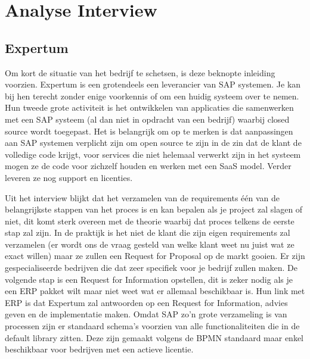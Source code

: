 
\chapter{Analyse Interview}
\label{ch:analyse_interview}

\section{Expertum}

Om kort de situatie van het bedrijf te schetsen, is deze beknopte inleiding voorzien. Expertum is een grotendeels een leverancier van SAP systemen. Je kan bij hen terecht zonder enige voorkennis of om een huidig systeem over te nemen. Hun tweede grote activiteit is het ontwikkelen van applicaties die samenwerken met een SAP systeem (al dan niet in opdracht van een bedrijf) waarbij closed source wordt toegepast. Het is belangrijk om op te merken is dat aanpassingen aan SAP systemen verplicht zijn om open source te zijn in de zin dat de klant de volledige code krijgt, voor services die niet helemaal verwerkt zijn in het systeem mogen ze de code voor zichzelf houden en werken met een SaaS model. Verder leveren ze nog support en licenties.

Uit het interview blijkt dat het verzamelen van de requirements één van de belangrijkste stappen van het proces is en kan bepalen als je project zal slagen of niet, dit komt sterk overeen met de theorie waarbij dat proces telkens de eerste stap zal zijn. In de praktijk is het niet de klant die zijn eigen requirements zal verzamelen (er wordt ons de vraag gesteld van welke klant weet nu juist wat ze exact willen) maar ze zullen een Request for Proposal op de markt gooien. Er zijn gespecialiseerde bedrijven die dat zeer specifiek voor je bedrijf zullen maken. De volgende stap is een Request for Information opstellen, dit is zeker nodig als je een ERP pakket wilt maar niet weet wat er allemaal beschikbaar is. Hun link met ERP is dat Expertum zal antwoorden op een Request for Information, advies geven en de implementatie maken. Omdat SAP zo'n grote verzameling is van processen zijn er standaard schema's voorzien van alle functionaliteiten die in de default library zitten. Deze zijn gemaakt volgens de BPMN standaard maar enkel beschikbaar voor bedrijven met een actieve licentie. 

